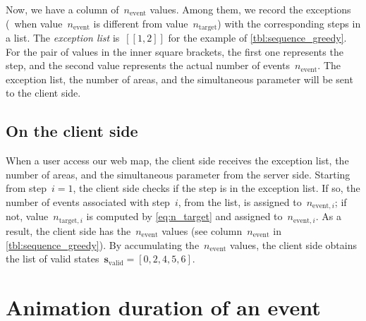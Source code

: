 \documentclass[twocolumn]{svjour3}          %
\begin{document}
Now, we have a column of~$n_\mathrm{event}$ values.
Among them, we record the exceptions 
(\ie~when value~$n_\mathrm{event}$ 
is different from value~$n_\mathrm{target}$) 
with the corresponding steps in a list.
The \emph{exception list} is~$[[1, 2]]$ for the example of \tabl\ref{tbl:sequence_greedy}.
For the pair of values in the inner square brackets,
the first one represents the step,
and the second value represents 
the actual number of events~$n_\mathrm{event}$.
The exception list, the number of areas, and the simultaneous parameter 
will be sent to the client side.
 

\subsection{On the client side}
\label{sec:communicate_client}


When a user access our web map,
the client side receives the exception list, the number of areas, 
and the simultaneous parameter from the server side.
Starting from step~$i=1$,
the client side checks if the step is in the exception list.
If so, the number of events associated with step~$i$, from the list, 
is assigned to~$n_{\mathrm{event},i}$;
if not, value~$n_{\mathrm{target},i}$ is computed by \eq\ref{eq:n_target} 
and assigned to~$n_{\mathrm{event},i}$.
As a result, the client side 
has the~$n_\mathrm{event}$ values
(see column~$n_\mathrm{event}$ in \tabl\ref{tbl:sequence_greedy}).
By accumulating the~$n_\mathrm{event}$ values,
the client side obtains the list of 
valid states~$\mathrm{\textbf{s}_{valid}} = [0, 2, 4, 5, 6]$.


\section{Animation duration of an event}
\label{appx:animation_duration_event}

\end{document}
